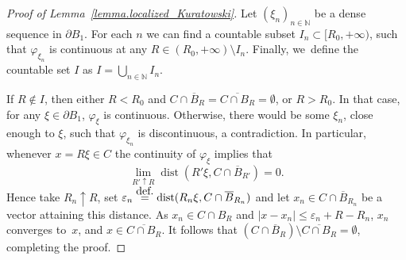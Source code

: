 \documentclass[11pt]{article}
\numberwithin{equation}{section}
\theoremstyle{definition}
\newcommand{\eqdef}{\ensuremath{\stackrel{\mbox{\upshape\tiny def.}}{=}}}
\DeclareMathOperator{\dist}{dist}
\newcommand{\oB}{\overline{B}}
\begin{document}
\begin{proof}[Proof of Lemma~\ref{lemma.localized_Kuratowski}]
Let $(\xi_n)_{n \in \mathbb{N}}$ be a dense sequence in $\partial B_1$.
For each $n$ we can find a countable subset $I_n\subset [R_0,+\infty)$, such that $\varphi_{\xi_n}$
is continuous at any $R\in (R_0,+\infty)\setminus I_n$.
Finally, we~define the countable set $I$ as
$
I= \bigcup_{n\in \mathbb{N}} I_n.
$

If $R\not\in I$, then either $R<R_0$ and
$C\cap\oB_R=\overline{C\cap B_R}=\emptyset$, or
$R>R_0$. In that case, for any $\xi\in\partial B_1$,
$\varphi_\xi$ is continuous. Otherwise, there would be some $\xi_n$,
close enough to $\xi$, such that $\varphi_{\xi_n}$ is discontinuous,
a contradiction. In particular, whenever $x = R\xi \in C$ the continuity of $\varphi_\xi$ implies that
\[
\lim_{R'\uparrow R}\dist(R'\xi,C\cap \oB_{R'})=0.
\]
Hence take $R_n \uparrow R$, set $\varepsilon_n \eqdef \dist(R_n\xi,C\cap \oB_{R_n})$ and let $x_n \in C\cap \oB_{R_n}$ be a vector attaining this distance. As $x_n \in C \cap B_R$ and $|x - x_n| \le \varepsilon_n + R - R_n$, $x_n$ converges to~$x$, and $x\in \overline{C\cap B_R}$. It follows that $(C\cap\oB_R)\setminus
\overline{C\cap B_R}=\emptyset$, completing the proof.
\end{proof}
\end{document}

